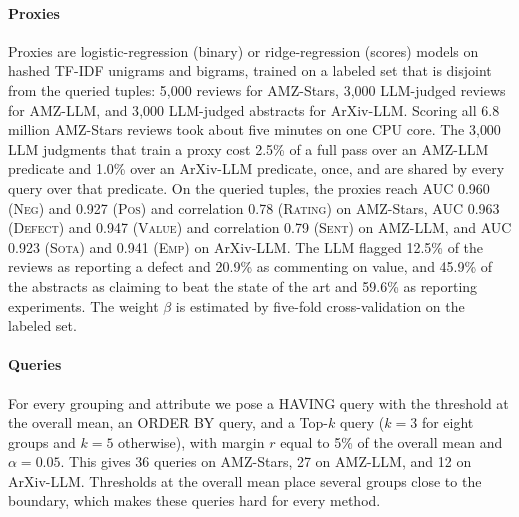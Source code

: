 \paragraph*{Proxies}
Proxies are logistic-regression (binary) or ridge-regression (scores) models on hashed TF-IDF unigrams and bigrams, trained on a labeled set that is disjoint from the queried tuples: 5{,}000 reviews for AMZ-Stars, 3{,}000 LLM-judged reviews for AMZ-LLM, and 3{,}000 LLM-judged abstracts for ArXiv-LLM.
Scoring all 6.8 million AMZ-Stars reviews took about five minutes on one CPU core.
The 3{,}000 LLM judgments that train a proxy cost 2.5\% of a full pass over an AMZ-LLM predicate and 1.0\% over an ArXiv-LLM predicate, once, and are shared by every query over that predicate.
On the queried tuples, the proxies reach AUC 0.960 (\textsc{Neg}) and 0.927 (\textsc{Pos}) and correlation 0.78 (\textsc{Rating}) on AMZ-Stars, AUC 0.963 (\textsc{Defect}) and 0.947 (\textsc{Value}) and correlation 0.79 (\textsc{Sent}) on AMZ-LLM, and AUC 0.923 (\textsc{Sota}) and 0.941 (\textsc{Emp}) on ArXiv-LLM.
The LLM flagged 12.5\% of the reviews as reporting a defect and 20.9\% as commenting on value, and 45.9\% of the abstracts as claiming to beat the state of the art and 59.6\% as reporting experiments.
The weight $\beta$ is estimated by five-fold cross-validation on the labeled set.

\paragraph*{Queries}
For every grouping and attribute we pose a HAVING query with the threshold at the overall mean, an ORDER BY query, and a Top-$k$ query ($k=3$ for eight groups and $k=5$ otherwise), with margin $r$ equal to 5\% of the overall mean and $\alpha=0.05$.
This gives 36 queries on AMZ-Stars, 27 on AMZ-LLM, and 12 on ArXiv-LLM.
Thresholds at the overall mean place several groups close to the boundary, which makes these queries hard for every method.

